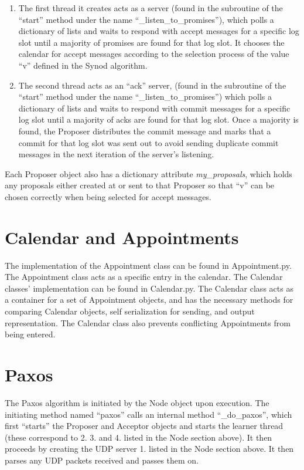 \documentclass{article}
\begin{document}
		\begin{enumerate}
			\item The first thread it creates acts as a server (found in the subroutine of the ``start'' method under the name ``\_listen\_to\_promises''), which polls a dictionary of lists and waits to respond with accept messages for a specific log slot until a majority of promises are found for that log slot. It chooses the calendar for accept messages according to the selection process of the value ``v'' defined in the Synod algorithm.
			\item The second thread acts as an ``ack'' server, (found in the subroutine of the ``start'' method under the name ``\_listen\_to\_promises'') which polls a dictionary of lists and waits to respond with commit messages for a specific log slot until a majority of acks are found for that log slot. Once a majority is found, the Proposer distributes the commit message and marks that a commit for that log slot was sent out to avoid sending duplicate commit messages in the next iteration of the server's listening.
		\end{enumerate}
	
		\noindent Each Proposer object also has a dictionary attribute \textit{my\_proposals}, which holds any proposals either created at or sent to that Proposer so that ``v'' can be chosen correctly when being selected for accept messages.

	\section{Calendar and Appointments}
		The implementation of the Appointment class can be found in Appointment.py. The Appointment class acts as a specific entry in the calendar. The Calendar classes' implementation can be found in Calendar.py. The Calendar class acts as a container for a set of Appointment objects, and has the necessary methods for comparing Calendar objects, self serialization for sending, and output representation. The Calendar class also prevents conflicting Appointments from being entered.

	\section{Paxos}
		The Paxos algorithm is initiated by the Node object upon execution. The initiating method named ``paxos'' calls an internal method ``\_do\_paxos'', which first ``starts'' the Proposer and Acceptor objects and starts the learner thread (these correspond to 2. 3. and 4. listed in the Node section above). It then proceeds by creating the UDP server 1. listed in the Node section above. It then parses any UDP packets received and passes them on.
\end{document}

